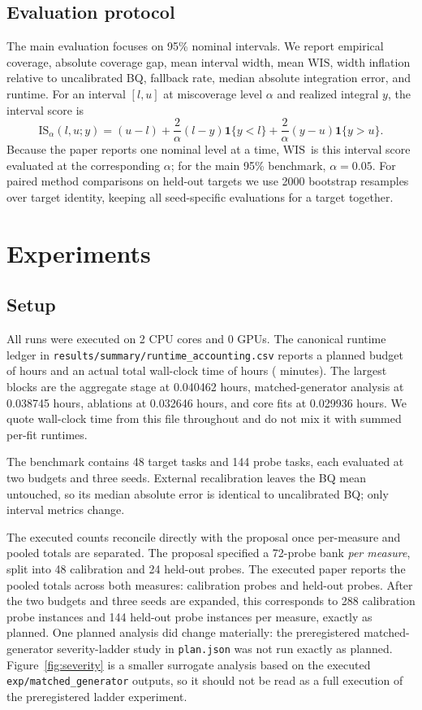 \documentclass{article}
\newcommand{\wis}{\ensuremath{\mathrm{WIS}}}
\begin{document}
\subsection{Evaluation protocol}
The main evaluation focuses on 95\% nominal intervals. We report empirical coverage, absolute coverage gap, mean interval width, mean \wis, width inflation relative to uncalibrated BQ, fallback rate, median absolute integration error, and runtime. For an interval $[l,u]$ at miscoverage level $\alpha$ and realized integral $y$, the interval score is
\[
\mathrm{IS}_{\alpha}(l,u;y)=(u-l)+\frac{2}{\alpha}(l-y)\mathbf{1}\{y<l\}+\frac{2}{\alpha}(y-u)\mathbf{1}\{y>u\}.
\]
Because the paper reports one nominal level at a time, \wis\ is this interval score evaluated at the corresponding $\alpha$; for the main 95\% benchmark, $\alpha=0.05$. For paired method comparisons on held-out targets we use 2000 bootstrap resamples over target identity, keeping all seed-specific evaluations for a target together.

\section{Experiments}
\label{sec:experiments}
\subsection{Setup}
All runs were executed on 2 CPU cores and 0 GPUs. The canonical runtime ledger in \texttt{results/summary/runtime\_accounting.csv} reports a planned budget of \RuntimePlannedHours{} hours and an actual total wall-clock time of \RuntimeActualHours{} hours (\RuntimeActualMinutes{} minutes). The largest blocks are the aggregate stage at 0.040462 hours, matched-generator analysis at 0.038745 hours, ablations at 0.032646 hours, and core fits at 0.029936 hours. We quote wall-clock time from this file throughout and do not mix it with summed per-fit runtimes.

The benchmark contains 48 target tasks and 144 probe tasks, each evaluated at two budgets and three seeds. External recalibration leaves the BQ mean untouched, so its median absolute error is identical to uncalibrated BQ; only interval metrics change.

The executed counts reconcile directly with the proposal once per-measure and pooled totals are separated. The proposal specified a 72-probe bank \emph{per measure}, split into 48 calibration and 24 held-out probes. The executed paper reports the pooled totals across both measures: \CalibrationProbeCount{} calibration probes and \HeldoutProbeCount{} held-out probes. After the two budgets and three seeds are expanded, this corresponds to 288 calibration probe instances and 144 held-out probe instances per measure, exactly as planned. One planned analysis did change materially: the preregistered matched-generator severity-ladder study in \texttt{plan.json} was not run exactly as planned. Figure~\ref{fig:severity} is a smaller surrogate analysis based on the executed \texttt{exp/matched\_generator} outputs, so it should not be read as a full execution of the preregistered ladder experiment.
\end{document}
